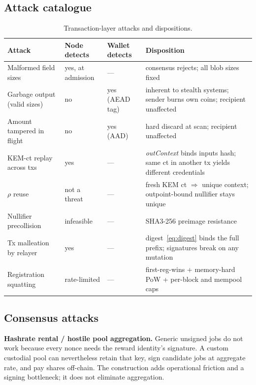\documentclass[11pt,a4paper]{article}
\begin{document}
\subsection{Attack catalogue}

\begin{table}[tbp]
\centering
\caption{Transaction-layer attacks and dispositions.}
\label{tab:attacks}
\small
\begin{tabularx}{\textwidth}{@{}lllX@{}}
\toprule
\textbf{Attack} & \textbf{Node detects} & \textbf{Wallet detects} & \textbf{Disposition} \\
\midrule
Malformed field sizes & yes, at admission & --- & consensus rejects; all blob sizes fixed \\
Garbage output (valid sizes) & no & yes (AEAD tag) & inherent to stealth systems; sender burns own coins; recipient unaffected \\
Amount tampered in flight & no & yes (AAD) & hard discard at scan; recipient unaffected \\
KEM-ct replay across txs & yes & --- & \emph{outContext} binds inputs hash; same ct in another tx yields different credentials \\
$\rho$ reuse & not a threat & --- & fresh KEM ct $\Rightarrow$ unique context; outpoint-bound nullifier stays unique \\
Nullifier precollision & infeasible & --- & SHA3-256 preimage resistance \\
Tx malleation by relayer & yes & --- & digest~\eqref{eq:digest} binds the full prefix; signatures break on any mutation \\
Registration squatting & rate-limited & --- & first-reg-wins + memory-hard PoW + per-block and mempool caps \\
\bottomrule
\end{tabularx}
\end{table}

\subsection{Consensus attacks}

\textbf{Hashrate rental / hostile pool aggregation.} Generic unsigned jobs do
not work because every nonce needs the reward identity's signature. A custom
custodial pool can nevertheless retain that key, sign candidate jobs at
aggregate rate, and pay shares off-chain. The construction adds operational
friction and a signing bottleneck; it does not eliminate aggregation.
\end{document}
